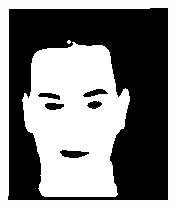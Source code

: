 \begin{figure}[h]
\begin{subfigure}[b]{0.18\textwidth}
         \includegraphics[width=\textwidth]{images/results/base/hh78.color.d3_skinny_5.png}
     \end{subfigure}
    \hfill
     \begin{subfigure}[b]{0.18\textwidth}
         \centering

\end{subfigure}
\end{figure}
